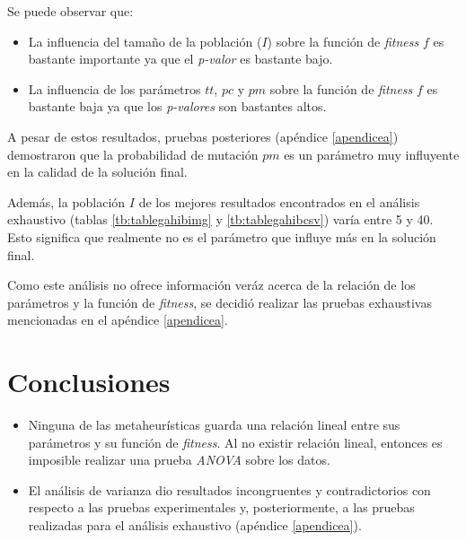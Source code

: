     Se puede observar que:
\begin{itemize}
    \item La influencia del tamaño de la población ($I$) sobre la función de
\emph{fitness} $f$ es bastante importante ya que el \emph{p-valor} es bastante
bajo.
    \item La influencia de los parámetros $tt$, $pc$ y $pm$ sobre la función de
\emph{fitness} $f$ es bastante baja ya que los \emph{p-valores} son bastantes
altos.
\end{itemize}

    A pesar de estos resultados, pruebas posteriores (apéndice \ref{apendicea}) demostraron
que la probabilidad de mutación $pm$ es un parámetro muy influyente en la
calidad de la solución final.

    Además, la población $I$ de los mejores resultados encontrados en el
análisis exhaustivo (tablas \ref{tb:tablegahibimg} y \ref{tb:tablegahibcsv})
varía entre 5 y 40. Esto significa que realmente no es el parámetro que influye
más en la solución final.

    Como este análisis no ofrece información veráz acerca de la relación de los
parámetros y la función de \emph{fitness}, se decidió realizar las pruebas
exhaustivas mencionadas en el apéndice \ref{apendicea}.

\section{Conclusiones}

\begin{itemize}
    \item Ninguna de las metaheurísticas guarda una relación lineal entre
sus parámetros y su función de \emph{fitness}. Al no existir relación lineal,
entonces es imposible realizar una prueba \emph{ANOVA} sobre los datos.
    \item El análisis de varianza dio resultados incongruentes y contradictorios
con respecto a las pruebas experimentales y, posteriormente, a las pruebas
realizadas para el análisis exhaustivo (apéndice \ref{apendicea}).
\end{itemize}
